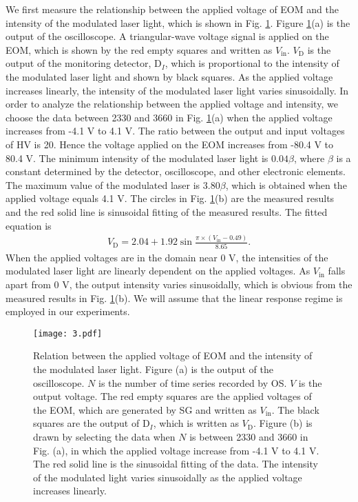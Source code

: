 \documentclass[12pt]{iopart}
\begin{document}
We first measure the relationship between the applied voltage of EOM and the intensity of the modulated laser light, which is shown in Fig. \ref{ratio}. Figure \ref{ratio}(a) is the output of the oscilloscope. A triangular-wave voltage signal is applied on the EOM, which is shown by the red empty squares and written as $V_{\text{in}}$. $V_{\text{D}}$ is the output of the monitoring detector, D$_I$, which is proportional to the intensity of the modulated laser light and shown by black squares. As the applied voltage increases linearly, the intensity of the modulated laser light varies sinusoidally. In order to analyze the relationship between the applied voltage and intensity, we choose the data between 2330 and 3660 in Fig. \ref{ratio}(a) when the applied voltage increases from -4.1 V to 4.1 V. The ratio between the output and input voltages of HV is 20. Hence the voltage applied on the EOM increases from -80.4 V to 80.4 V. The minimum intensity of the modulated laser light is $0.04\beta$, where $\beta$ is a constant determined by the detector, oscilloscope, and other electronic elements. The maximum value of the modulated laser is $3.80\beta$, which is obtained when the applied voltage equals 4.1 V. The circles in Fig. \ref{ratio}(b) are the measured results and the red solid line is sinusoidal fitting of the measured results. The fitted equation is 
\begin{eqnarray}\label{fitted}
V_{\text{D}}=2.04+1.92\sin \frac{\pi \times (V_{\text{in}}-0.49)}{8.65}.
\end{eqnarray}
When the applied voltages are in the domain near 0 V, the intensities of the modulated laser light are linearly dependent on the applied voltages. As $V_{\text{in}}$ falls apart from 0 V, the output intensity varies sinusoidally, which is obvious from the measured results in Fig. \ref{ratio}(b). We will assume that the linear response regime is employed in our experiments.

\begin{figure}[htbp]
\centering
\texttt{[image: 3.pdf]}
\caption{Relation between the applied voltage of EOM and the intensity of the modulated laser light. Figure (a) is the output of the oscilloscope. $N$ is the number of time series recorded by OS. $V$ is the output voltage.  The red empty squares are the applied voltages of the EOM, which are generated by SG and written as $V_{\text{in}}$. The black squares are the output of D$_I$, which is written as $V_{\text{D}}$. Figure (b) is drawn by selecting the data when $N$ is between 2330 and 3660 in Fig. (a), in which the applied voltage increase from -4.1 V to 4.1 V. The red solid line is the sinusoidal fitting of the data. The intensity of the modulated light varies sinusoidally as the applied voltage increases linearly.}\label{ratio}
\end{figure}
\end{document}
